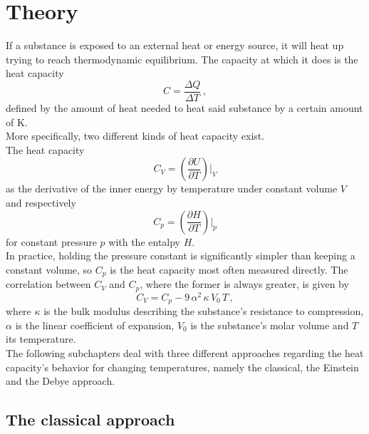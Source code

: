 \section{Theory}
\label{sec:theorie}

If a substance is exposed to an external heat or energy source,
it will heat up trying to reach thermodynamic equilibrium.
The capacity at which it does is the heat capacity
\begin{equation}
    C = \frac{\Delta Q}{\Delta T} \,,
    \label{eq:heat_cap}
\end{equation}
defined by the amount of heat needed to heat said substance by a certain amount of
$\si{\kelvin}$. \\

More specifically, two different kinds of heat capacity exist. \\
The heat capacity 
\begin{equation*}
    C_{V} = \left( \frac{\partial U}{\partial T} \right) \big \vert _V
\end{equation*}
as the derivative of the inner energy by temperature under constant volume $V$ and respectively
\begin{equation*}
    C_{p} = \left( \frac{\partial H}{\partial T} \right) \big \vert _p
\end{equation*}
for constant pressure $p$ with the entalpy $H$. \\

In practice, holding the pressure constant is significantly simpler than keeping a constant volume, so $C_p$ is the heat capacity most often measured directly.
The correlation between $C_V$ and $C_p$, where the former is always greater, is given by
\begin{equation}
    C_V = C_p - 9 \, \alpha^2 \, \kappa \, V_0 \, T \,,
    \label{eq:CVtoCp}
\end{equation}
where $ \kappa $ is the bulk modulus describing the substance's resistance to compression, $\alpha$ is the linear coefficient of expansion, $V_0$ is the substance's molar volume and $T$ its temperature. \\

The following subchapters deal with three different approaches regarding the heat capacity's behavior for changing temperatures, namely the classical, the Einstein and the Debye approach.

\subsection{The classical approach}

